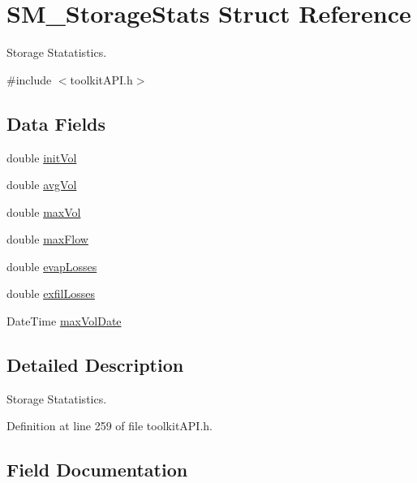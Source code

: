 \hypertarget{struct_s_m___storage_stats}{}\section{S\+M\+\_\+\+Storage\+Stats Struct Reference}
\label{struct_s_m___storage_stats}


Storage Statatistics.  




{\ttfamily \#include $<$toolkit\+A\+P\+I.\+h$>$}

\subsection*{Data Fields}
\begin{DoxyCompactItemize}
\item 
double \hyperlink{struct_s_m___storage_stats_acdb84b3495ce673cdb2a0ce99c95484d}{init\+Vol}
\item 
double \hyperlink{struct_s_m___storage_stats_a9c5f7d0519c38ef53aba14d673e56008}{avg\+Vol}
\item 
double \hyperlink{struct_s_m___storage_stats_a4e178bd9894a08b39d615b68b788e09e}{max\+Vol}
\item 
double \hyperlink{struct_s_m___storage_stats_a4d84bca5454f3903c44fe865e44674f5}{max\+Flow}
\item 
double \hyperlink{struct_s_m___storage_stats_a26f9ddf7a3fa4cc0e243386380eec7a4}{evap\+Losses}
\item 
double \hyperlink{struct_s_m___storage_stats_adcd5d7e08a26246b15048680595f4581}{exfil\+Losses}
\item 
Date\+Time \hyperlink{struct_s_m___storage_stats_aa1b855c3609187dd317a0d75169769ab}{max\+Vol\+Date}
\end{DoxyCompactItemize}


\subsection{Detailed Description}
Storage Statatistics. 

Definition at line 259 of file toolkit\+A\+P\+I.\+h.



\subsection{Field Documentation}
\mbox{\label{struct_s_m___storage_stats_a9c5f7d0519c38ef53aba14d673e56008}} 
